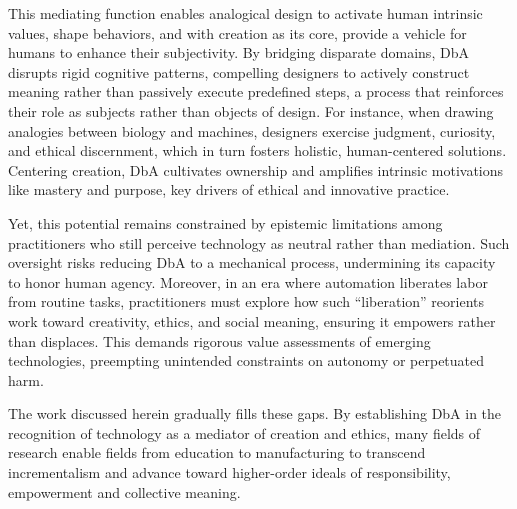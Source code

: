 This mediating function enables analogical design to activate human intrinsic values, shape behaviors, and with creation as its core, provide a vehicle for humans to enhance their subjectivity\cite{schecter2025role}. By bridging disparate domains, DbA disrupts rigid cognitive patterns, compelling designers to actively construct meaning rather than passively execute predefined steps, a process that reinforces their role as subjects rather than objects of design\cite{schecter2025role, shao2025future, hsueh2024counts}. For instance, when drawing analogies between biology and machines, designers exercise judgment, curiosity, and ethical discernment, which in turn fosters holistic, human-centered solutions. Centering creation, DbA cultivates ownership and amplifies intrinsic motivations like mastery and purpose, key drivers of ethical and innovative practice. 

Yet, this potential remains constrained by epistemic limitations among practitioners who still perceive technology as neutral rather than mediation\cite{muukkonen2005technology}. Such oversight risks reducing DbA to a mechanical process, undermining its capacity to honor human agency. Moreover, in an era where automation liberates labor from routine tasks\cite{hsueh2024counts, shao2025future, zhong2017intelligent}, practitioners must explore how such ``liberation'' reorients work toward creativity, ethics, and social meaning, ensuring it empowers rather than displaces. This demands rigorous value assessments of emerging technologies, preempting unintended constraints on autonomy or perpetuated harm\cite{de2018can, smits2019values}.

The work discussed herein gradually fills these gaps. By establishing DbA in the recognition of technology as a mediator of creation and ethics, many fields of research enable fields from education to manufacturing to transcend incrementalism\cite{johnson1988rethinking} and advance toward higher-order ideals of responsibility, empowerment and collective meaning.
